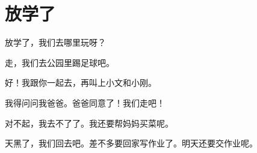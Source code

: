 \documentclass[12pt,UTF-8,openany]{ctexbook}
\begin{document}
\clearpage

\begin{center}
    
    
    
\end{center}


\hanzibox{}\hanzibox{}\hanzibox{}\hanzibox{}\hspace{1em}\hanzibox{}\hanzibox{}\hanzibox{}\hanzibox{}

\hanzibox{}\hanzibox{}\hanzibox{}\hanzibox{}\hspace{1em}\hanzibox{}\hanzibox{}\hanzibox{}\hanzibox{}

\hanzibox{}\hanzibox{}\hanzibox{}\hanzibox{}\hspace{1em}\hanzibox{}\hanzibox{}\hanzibox{}\hanzibox{}






\chapter{放学了}

\begin{large}
    
    放学了，我们去哪里玩呀？
    
    走，我们去公园里踢足球吧。
    
    好！我跟你一起去，再叫上小文和小刚。
    
    我得问问我爸爸。爸爸同意了！我们走吧！
    
    对不起，我去不了了。我还要帮妈妈买菜呢。
    
    天黑了，我们回去吧。差不多要回家写作业了。明天还要交作业呢。
    
\end{large}


\clearpage

\begin{center}
    
\end{center}


\hanzibox{}\hanzibox{}\hanzibox{}\hanzibox{}\hspace{1em}\hanzibox{}\hanzibox{}\hanzibox{}\hanzibox{}
\end{document}
